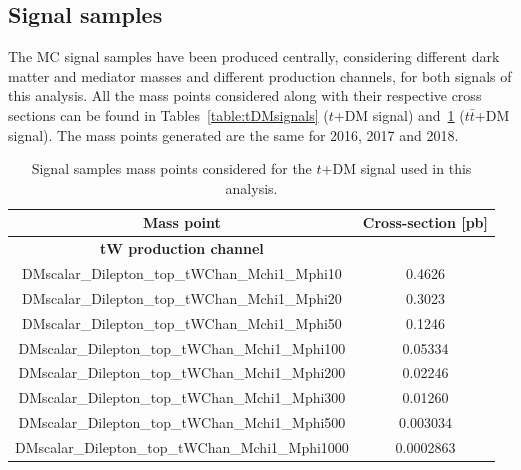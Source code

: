 \documentclass[a4paper, 10pt, openright]{report}
\begin{document}
\begin{appendices}
\section{Signal samples}  \label{appendix:SignalSamples}

The \ac{MC} signal samples have been produced centrally, considering different dark matter and mediator masses and different production channels, for both signals of this analysis. All the mass points considered along with their respective cross sections can be found in Tables~\ref{table:tDMsignals} ($t$+DM signal) and~\ref{table:ttDMsignals} ($t \bar t$+DM signal). The mass points generated are the same for 2016, 2017 and 2018.

\begin{table}
\begin{center}
\begin{tabular}{ c|c } 
 \hline
 Mass point & Cross-section [pb] \\
\hline
\textbf{tW production channel} & \\
 DMscalar\_Dilepton\_top\_tWChan\_Mchi1\_Mphi10 & 0.4626 \\
 DMscalar\_Dilepton\_top\_tWChan\_Mchi1\_Mphi20 & 0.3023 \\
 DMscalar\_Dilepton\_top\_tWChan\_Mchi1\_Mphi50 & 0.1246 \\
 DMscalar\_Dilepton\_top\_tWChan\_Mchi1\_Mphi100 & 0.05334 \\
 DMscalar\_Dilepton\_top\_tWChan\_Mchi1\_Mphi200 & 0.02246 \\
 DMscalar\_Dilepton\_top\_tWChan\_Mchi1\_Mphi300 & 0.01260 \\
 DMscalar\_Dilepton\_top\_tWChan\_Mchi1\_Mphi500 & 0.003034 \\
 DMscalar\_Dilepton\_top\_tWChan\_Mchi1\_Mphi1000 & 0.0002863 \\
 \hline
\end{tabular}
\caption{Signal samples mass points considered for the $t$+DM signal used in this analysis.}
\label{table:ttDMsignals}
\end{center}
\end{table}


\end{appendices}
\end{document}
